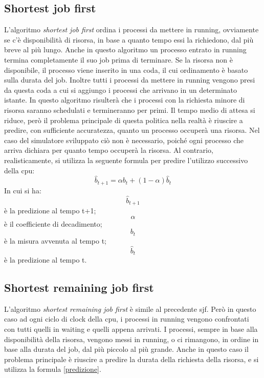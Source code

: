 \documentclass[Lau, oneside]{sapthesis}%
\begin{document}
\subsection{Shortest job first}
\label{subsec:sjf}
L'algoritmo \textit{shortest job first} ordina i processi da mettere in running, ovviamente se c'è disponibilità di risorsa, in base a quanto tempo essi la richiedono, dal più breve al più lungo.
Anche in questo algoritmo un processo entrato in running termina completamente il suo job prima di terminare.
Se la risorsa non è disponibile, il processo viene inserito in una coda, il cui ordinamento è basato sulla durata del job.
Inoltre tutti i processi da mettere in running vengono presi da questa coda a cui si aggiungo i processi che arrivano in un determinato istante.
In questo algoritmo risulterà che i processi con la richiesta minore di risorsa saranno schedulati e termineranno per primi.
Il tempo medio di attesa si riduce, però il problema principale di questa politica nella realtà è riuscire a predire, con sufficiente accuratezza, quanto un processo occuperà una risorsa.
Nel caso del simulatore sviluppato ciò non è necessario, poiché ogni processo che arriva dichiara per quanto tempo occuperà la risorsa.
Al contrario, realisticamente, si utilizza la seguente formula per predire l'utilizzo successivo della cpu:
\begin{equation}\label{predizione}
   \hat{b}_{t+1} = \alpha b_t + (1 - \alpha) \hat{b}_t
\end{equation}
In cui si ha:
\begin{equation}
  \hat{b}_{t+1}
\end{equation}
è la predizione al tempo t+1;
\begin{equation}
    \alpha
\end{equation}
è il coefficiente di decadimento;
\begin{equation}
    b_t
\end{equation}
è la misura avvenuta al tempo t;
\begin{equation}
    \hat{b}_t
\end{equation}
è la predizione al tempo t.

\subsection{Shortest remaining job first}
\label{subsec:srjf}
L'algoritmo \textit{shortest remaining job first} è simile al precedente sjf.
Però in questo caso ad ogni ciclo di clock della cpu, i processi in running vengono confrontati con tutti quelli in waiting e quelli appena arrivati.
I processi, sempre in base alla disponibilità della risorsa, vengono messi in running, o ci rimangono, in ordine in base alla durata del job, dal più piccolo al più grande.
Anche in questo caso il problema principale è riuscire a predire la durata della richiesta della risorsa, e si utilizza la formula \eqref{predizione}.
\end{document}
